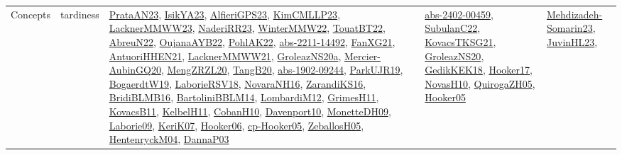 {\begin{longtable}{lp{3cm}>{\raggedright}p{6cm}>{\raggedright}p{6cm}p{8cm}}
Concepts & tardiness & \href{articles/PrataAN23.pdf}{PrataAN23}\cite{PrataAN23}, \href{articles/IsikYA23.pdf}{IsikYA23}\cite{IsikYA23}, \href{articles/AlfieriGPS23.pdf}{AlfieriGPS23}\cite{AlfieriGPS23}, \href{papers/KimCMLLP23.pdf}{KimCMLLP23}\cite{KimCMLLP23}, \href{articles/LacknerMMWW23.pdf}{LacknerMMWW23}\cite{LacknerMMWW23}, \href{articles/NaderiRR23.pdf}{NaderiRR23}\cite{NaderiRR23}, \href{papers/WinterMMW22.pdf}{WinterMMW22}\cite{WinterMMW22}, \href{papers/TouatBT22.pdf}{TouatBT22}\cite{TouatBT22}, \href{articles/AbreuN22.pdf}{AbreuN22}\cite{AbreuN22}, \href{papers/OujanaAYB22.pdf}{OujanaAYB22}\cite{OujanaAYB22}, \href{articles/PohlAK22.pdf}{PohlAK22}\cite{PohlAK22}, \href{articles/abs-2211-14492.pdf}{abs-2211-14492}\cite{abs-2211-14492}, \href{articles/FanXG21.pdf}{FanXG21}\cite{FanXG21}, \href{papers/AntuoriHHEN21.pdf}{AntuoriHHEN21}\cite{AntuoriHHEN21}, \href{papers/LacknerMMWW21.pdf}{LacknerMMWW21}\cite{LacknerMMWW21}, \href{papers/GroleazNS20a.pdf}{GroleazNS20a}\cite{GroleazNS20a}, \href{papers/Mercier-AubinGQ20.pdf}{Mercier-AubinGQ20}\cite{Mercier-AubinGQ20}, \href{articles/MengZRZL20.pdf}{MengZRZL20}\cite{MengZRZL20}, \href{papers/TangB20.pdf}{TangB20}\cite{TangB20}, \href{articles/abs-1902-09244.pdf}{abs-1902-09244}\cite{abs-1902-09244}, \href{papers/ParkUJR19.pdf}{ParkUJR19}\cite{ParkUJR19}, \href{papers/BogaerdtW19.pdf}{BogaerdtW19}\cite{BogaerdtW19}, \href{articles/LaborieRSV18.pdf}{LaborieRSV18}\cite{LaborieRSV18}, \href{articles/NovaraNH16.pdf}{NovaraNH16}\cite{NovaraNH16}, \href{articles/ZarandiKS16.pdf}{ZarandiKS16}\cite{ZarandiKS16}, \href{articles/BridiBLMB16.pdf}{BridiBLMB16}\cite{BridiBLMB16}, \href{papers/BartoliniBBLM14.pdf}{BartoliniBBLM14}\cite{BartoliniBBLM14}, \href{articles/LombardiM12.pdf}{LombardiM12}\cite{LombardiM12}, \href{papers/GrimesH11.pdf}{GrimesH11}\cite{GrimesH11}, \href{articles/KovacsB11.pdf}{KovacsB11}\cite{KovacsB11}, \href{articles/KelbelH11.pdf}{KelbelH11}\cite{KelbelH11}, \href{papers/CobanH10.pdf}{CobanH10}\cite{CobanH10}, \href{papers/Davenport10.pdf}{Davenport10}\cite{Davenport10}, \href{papers/MonetteDH09.pdf}{MonetteDH09}\cite{MonetteDH09}, \href{papers/Laborie09.pdf}{Laborie09}\cite{Laborie09}, \href{papers/KeriK07.pdf}{KeriK07}\cite{KeriK07}, \href{articles/Hooker06.pdf}{Hooker06}\cite{Hooker06}, \href{papers/cp-Hooker05.pdf}{cp-Hooker05}\cite{cp-Hooker05}, \href{articles/ZeballosH05.pdf}{ZeballosH05}\cite{ZeballosH05}, \href{papers/HentenryckM04.pdf}{HentenryckM04}\cite{HentenryckM04}, \href{papers/DannaP03.pdf}{DannaP03}\cite{DannaP03} & \href{articles/abs-2402-00459.pdf}{abs-2402-00459}\cite{abs-2402-00459}, \href{articles/SubulanC22.pdf}{SubulanC22}\cite{SubulanC22}, \href{papers/KovacsTKSG21.pdf}{KovacsTKSG21}\cite{KovacsTKSG21}, \href{papers/GroleazNS20.pdf}{GroleazNS20}\cite{GroleazNS20}, \href{articles/GedikKEK18.pdf}{GedikKEK18}\cite{GedikKEK18}, \href{papers/Hooker17.pdf}{Hooker17}\cite{Hooker17}, \href{articles/NovasH10.pdf}{NovasH10}\cite{NovasH10}, \href{papers/QuirogaZH05.pdf}{QuirogaZH05}\cite{QuirogaZH05}, \href{articles/Hooker05.pdf}{Hooker05}\cite{Hooker05} & \href{papers/Mehdizadeh-Somarin23.pdf}{Mehdizadeh-Somarin23}\cite{Mehdizadeh-Somarin23}, \href{papers/JuvinHL23.pdf}{JuvinHL23}\cite{JuvinHL23}, 
\end{longtable}}
